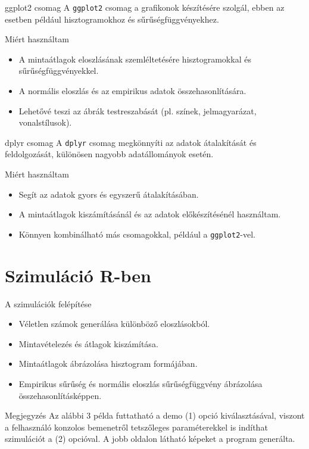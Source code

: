 \documentclass[aspectratio=169,12pt]{beamer}
\begin{document}
	\begin{frame}{ggplot2 csomag}
		A \texttt{ggplot2} csomag a grafikonok készítésére szolgál, ebben az esetben például hisztogramokhoz és sűrűségfüggvényekhez.
		\vfill
		\begin{block}{Miért használtam}
			\begin{itemize}
				\item A mintaátlagok eloszlásának szemléltetésére hisztogramokkal és sűrűségfüggvényekkel.
				\item A normális eloszlás és az empirikus adatok összehasonlítására.
				\item Lehetővé teszi az ábrák testreszabását (pl. színek, jelmagyarázat, vonalstílusok).
			\end{itemize}
		\end{block}
	\end{frame}
	
	\begin{frame}{dplyr csomag}
		A \texttt{dplyr} csomag megkönnyíti az adatok átalakítását és feldolgozását, különösen nagyobb adatállományok esetén.
		\vfill
		\begin{block}{Miért használtam}
			\begin{itemize}
				\item Segít az adatok gyors és egyszerű átalakításában.
				\item A mintaátlagok kiszámításánál és az adatok előkészítésénél használtam.
				\item Könnyen kombinálható más csomagokkal, például a \texttt{ggplot2}-vel.
			\end{itemize}
		\end{block}
	\end{frame}
	
	\section{Szimuláció R-ben}
	\begin{frame}{A szimulációk felépítése}
		\begin{itemize}
			\item Véletlen számok generálása különböző eloszlásokból.
			\item Mintavételezés és átlagok kiszámítása.
			\item Mintaátlagok ábrázolása hisztogram formájában.
			\item Empirikus sűrűség és normális eloszlás sűrűségfüggvény ábrázolása összehasonlításképpen.
		\end{itemize}
		\begin{block}{Megjegyzés}
			Az alábbi 3 példa futtatható a demo (1) opció kiválasztásával, viszont a felhasználó konzolos bemenetről tetszőleges paraméterekkel is indíthat szimulációt a (2) opcióval. A jobb oldalon látható képeket a program generálta.
		\end{block}
	\end{frame}
	
\end{document}
